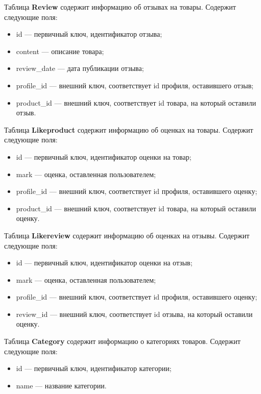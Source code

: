 Таблица \textbf{Review} содержит информацию об отзывах на товары. Содержит следующие поля:

\begin{itemize}
	\item id --- первичный ключ, идентификатор отзыва;
	\item content --- описание товара;
	\item review\_date --- дата публикации отзыва;
	\item profile\_id --- внешний ключ, соответствует id профиля, оставившего отзыв;
	\item product\_id --- внешний ключ, соответствует id товара, на который оставили отзыв.
\end{itemize}

Таблица \textbf{Likeproduct} содержит информацию об оценках на товары. Содержит следующие поля:

\begin{itemize}
	\item id --- первичный ключ, идентификатор оценки на товар;
	\item mark --- оценка, оставленная пользователем;
	\item profile\_id --- внешний ключ, соответствует id профиля, оставившего оценку;
	\item product\_id --- внешний ключ, соответствует id товара, на который оставили оценку.
\end{itemize}

Таблица \textbf{Likereview} содержит информацию об оценках на отзывы. Содержит следующие поля:

\begin{itemize}
	\item id --- первичный ключ, идентификатор оценки на отзыв;
	\item mark --- оценка, оставленная пользователем;
	\item profile\_id --- внешний ключ, соответствует id профиля, оставившего оценку;
	\item review\_id --- внешний ключ, соответствует id отзыва, на который оставили оценку.
\end{itemize}

Таблица \textbf{Category} содержит информацию о категориях товаров. Содержит следующие поля:

\begin{itemize}
	\item id --- первичный ключ, идентификатор категории;
	\item name --- название категории.
\end{itemize}

